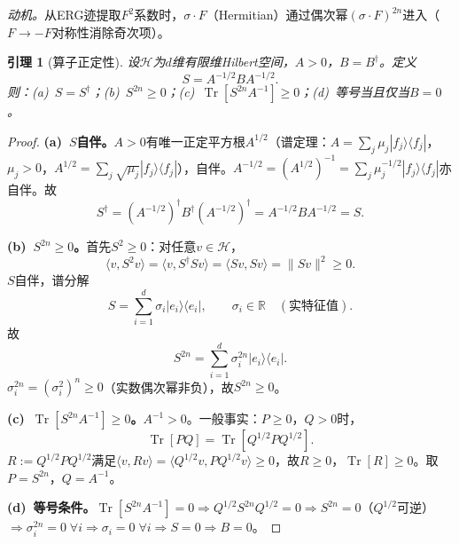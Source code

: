 \documentclass[12pt,a4paper]{article}
\theoremstyle{plain}
\newtheorem{lemma}[theorem]{引理}
\theoremstyle{definition}
\theoremstyle{remark}
\begin{document}
\textit{动机。}从ERG迹提取$F^2$系数时，$\sigma\cdot F$（Hermitian）通过偶次幂$(\sigma\cdot F)^{2n}$进入（$F\to -F$对称性消除奇次项）。

\begin{lemma}[算子正定性]\label{lem:op}
设$\mathcal{H}$为$d$维有限维Hilbert空间，$A>0$，$B=B^\dagger$。定义
\begin{equation}\label{eq:Sdef}
S = A^{-1/2}BA^{-1/2}.
\end{equation}
则：(a)~$S=S^\dagger$；(b)~$S^{2n}\geq 0$；(c)~$\operatorname{Tr}[S^{2n}A^{-1}]\geq 0$；(d)~等号当且仅当$B=0$。
\end{lemma}

\begin{proof}
\textbf{(a)~$S$自伴。}$A>0$有唯一正定平方根$A^{1/2}$（谱定理：$A=\sum_j\mu_j|f_j\rangle\langle f_j|$，$\mu_j>0$，$A^{1/2}=\sum_j\sqrt{\mu_j}|f_j\rangle\langle f_j|$），自伴。$A^{-1/2}=(A^{1/2})^{-1}=\sum_j\mu_j^{-1/2}|f_j\rangle\langle f_j|$亦自伴。故
\begin{equation}
S^\dagger = (A^{-1/2})^\dagger B^\dagger (A^{-1/2})^\dagger = A^{-1/2}BA^{-1/2} = S.
\end{equation}

\textbf{(b)~$S^{2n}\geq 0$。}首先$S^2\geq 0$：对任意$v\in\mathcal{H}$，
\begin{equation}\label{eq:S2psd}
\langle v,S^2v\rangle = \langle v,S^\dagger Sv\rangle = \langle Sv,Sv\rangle = \|Sv\|^2 \geq 0.
\end{equation}
$S$自伴，谱分解
\begin{equation}\label{eq:Sspectral}
S=\sum_{i=1}^d\sigma_i|e_i\rangle\langle e_i|, \qquad \sigma_i\in\mathbb{R}\quad(\text{实特征值}).
\end{equation}
故
\begin{equation}\label{eq:S2n}
S^{2n} = \sum_{i=1}^d \sigma_i^{2n}|e_i\rangle\langle e_i|.
\end{equation}
$\sigma_i^{2n}=(\sigma_i^2)^n\geq 0$（实数偶次幂非负），故$S^{2n}\geq 0$。

\textbf{(c)~$\operatorname{Tr}[S^{2n}A^{-1}]\geq 0$。}$A^{-1}>0$。一般事实：$P\geq 0$，$Q>0$时，
\begin{equation}\label{eq:TrPQ}
\operatorname{Tr}[PQ] = \operatorname{Tr}[Q^{1/2}PQ^{1/2}].
\end{equation}
$R:=Q^{1/2}PQ^{1/2}$满足$\langle v,Rv\rangle=\langle Q^{1/2}v,PQ^{1/2}v\rangle\geq 0$，故$R\geq 0$，$\operatorname{Tr}[R]\geq 0$。取$P=S^{2n}$，$Q=A^{-1}$。

\textbf{(d)~等号条件。}$\operatorname{Tr}[S^{2n}A^{-1}]=0\Rightarrow Q^{1/2}S^{2n}Q^{1/2}=0\Rightarrow S^{2n}=0$（$Q^{1/2}$可逆）$\Rightarrow\sigma_i^{2n}=0\;\forall i\Rightarrow\sigma_i=0\;\forall i\Rightarrow S=0\Rightarrow B=0$。
\end{proof}
\end{document}
